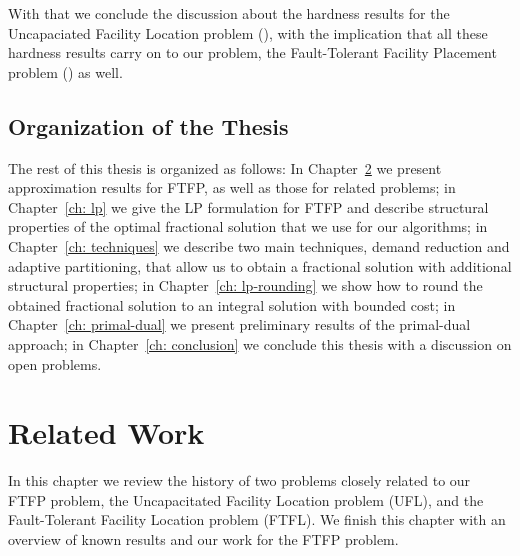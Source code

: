 \documentclass[oneside,final]{ucr}
\begin{document}
With that we conclude the discussion about the hardness results
for the Uncapaciated Facility Location problem ({\UFL}),
with the implication that all these hardness results carry
on to our problem, the Fault-Tolerant Facility Placement
problem (\FTFP) as well.

\section{Organization of the Thesis}
The rest of this thesis is organized as follows: In
Chapter~\ref{ch: related_work} we present approximation
results for FTFP, as well as those for related problems; in
Chapter~\ref{ch: lp} we give the LP formulation for FTFP and
describe structural properties of the optimal fractional
solution that we use for our algorithms; in Chapter~\ref{ch:
  techniques} we describe two main techniques, demand
reduction and adaptive partitioning, that allow us to obtain
a fractional solution with additional structural properties;
in Chapter~\ref{ch: lp-rounding} we show how to round the
obtained fractional solution to an integral solution with
bounded cost; in Chapter~\ref{ch: primal-dual} we present
preliminary results of the primal-dual approach; in
Chapter~\ref{ch: conclusion} we conclude this thesis with a
discussion on open problems.


\chapter{Related Work} \label{ch: related_work}

In this chapter we review the history of two problems
closely related to our FTFP problem, the Uncapacitated
Facility Location problem (UFL), and the Fault-Tolerant
Facility Location problem (FTFL).  We finish this chapter
with an overview of known results and our work for the FTFP
problem.
\end{document}
